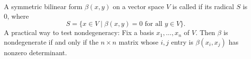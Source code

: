 A symmetric bilinear form $\beta(x, y)$ on a vector space $V$ is called  if its radical $S$ is $0$, where
$$S = \{x \in V \mid \beta(x, y) = 0 \text{ for all } y \in V\}.$$
A practical way to test nondegeneracy: Fix a basis $x_1, \ldots, x_n$ of $V$. Then $\beta$ is nondegenerate if and only if the $n \times n$ matrix whose $i, j$ entry is $\beta(x_i, x_j)$ has nonzero determinant.

